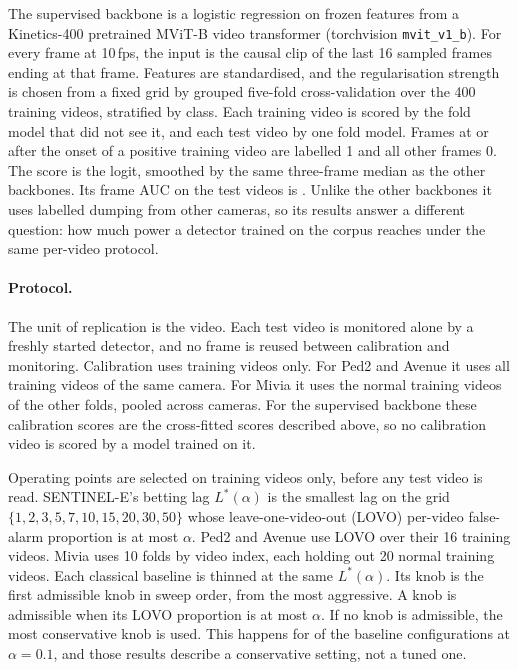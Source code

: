 The supervised backbone is a logistic regression on frozen features from a
Kinetics-400 pretrained MViT-B video transformer (torchvision \texttt{mvit\_v1\_b}).
For every frame at 10\,fps, the input is the causal clip of the last 16 sampled
frames ending at that frame. Features are standardised, and the regularisation
strength is chosen from a fixed grid by grouped five-fold cross-validation over the
400 training videos, stratified by class. Each training video is scored by the fold
model that did not see it, and each test video by one fold model. Frames at or
after the onset of a positive training video are labelled 1 and all other frames 0.
The score is the logit, smoothed by the same three-frame median as the other
backbones. Its frame AUC on the test videos is \RThreeMiviaSupAuc{}. Unlike the
other backbones it uses labelled dumping from other cameras, so its results answer
a different question: how much power a detector trained on the corpus reaches
under the same per-video protocol.

\paragraph{Protocol.} The unit of replication is the video. Each test video is
monitored alone by a freshly started detector, and no frame is reused between
calibration and monitoring. Calibration uses training videos only. For Ped2
and Avenue it uses all training videos of the same camera. For Mivia it uses
the normal training videos of the other folds, pooled across cameras. For the
supervised backbone these calibration scores are the cross-fitted scores described
above, so no calibration video is scored by a model trained on it.

Operating points are selected on training videos only, before any test video
is read. SENTINEL-E's betting lag $L^\ast(\alpha)$ is the smallest lag on the
grid $\{1,2,3,5,7,10,15,20,30,50\}$ whose leave-one-video-out (LOVO)
per-video false-alarm proportion is at most $\alpha$. Ped2 and Avenue use
LOVO over their 16 training videos. Mivia uses 10 folds by video index, each
holding out 20 normal training videos. Each classical baseline is thinned at the same
$L^\ast(\alpha)$. Its knob is the first admissible knob in sweep order, from the
most aggressive. A knob is admissible when its LOVO proportion is at most
$\alpha$. If no knob is admissible, the most conservative knob is used. This
happens for \RThreeBaselineNoKnob{} of the \RThreeBaselineConfigs{} baseline
configurations at $\alpha=0.1$, and those results describe a conservative
setting, not a tuned one.


